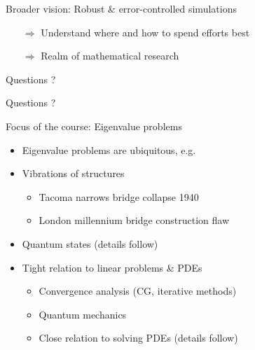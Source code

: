 \begin{frame}{Broader vision: Robust \& error-controlled simulations}
\begin{itemize}
    \vspace{0.3em}
    \item[$\Rightarrow$] Understand \alert{where and how} to spend efforts best
    \vspace{-0.3em}
    \item[$\Rightarrow$] Realm of mathematical research
\end{itemize}
\vspace{1em}
\end{frame}


\begin{frame}{Questions ?}
    \begin{center}
        \huge{Questions ?}
    \end{center}
\end{frame}

\begin{frame}{Focus of the course: Eigenvalue problems}
    \begin{itemize}
        \item Eigenvalue problems are ubiquitous, e.g.
        \vspace{2em}
        \item \alert{Vibrations of structures}
            \begin{itemize}
                \item Tacoma narrows bridge collapse 1940
                \item London millennium bridge construction flaw
            \end{itemize}
        \vspace{1em}
        \item \alert{Quantum states} \textcolor{grey5}{\smaller (details follow)}
        \vspace{1em}
        \item Tight relation to \alert{linear problems \& PDEs}
            \begin{itemize}
                \item Convergence analysis (CG, iterative methods)
                \item Quantum mechanics
                \item Close relation to solving PDEs
                    \textcolor{grey5}{\smaller (details follow)}
            \end{itemize}
    \end{itemize}
\end{frame}
